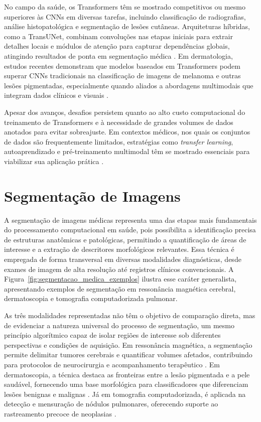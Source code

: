 No campo da saúde, os Transformers têm se mostrado competitivos ou mesmo superiores às CNNs em diversas tarefas, incluindo classificação de radiografias, análise histopatológica e segmentação de lesões cutâneas. Arquiteturas híbridas, como a TransUNet, combinam convoluções nas etapas iniciais para extrair detalhes locais e módulos de atenção para capturar dependências globais, atingindo resultados de ponta em segmentação médica \cite{chen2021transunet}. Em dermatologia, estudos recentes demonstram que modelos baseados em Transformers podem superar CNNs tradicionais na classificação de imagens de melanoma e outras lesões pigmentadas, especialmente quando aliados a abordagens multimodais que integram dados clínicos e visuais \cite{liu2021swin,raghu2021vision}.

Apesar dos avanços, desafios persistem quanto ao alto custo computacional do treinamento de Transformers e à necessidade de grandes volumes de dados anotados para evitar sobreajuste. Em contextos médicos, nos quais os conjuntos de dados são frequentemente limitados, estratégias como \textit{transfer learning}, autoaprendizado e pré-treinamento multimodal têm se mostrado essenciais para viabilizar sua aplicação prática \cite{khan2022transformers}.


\section{Segmentação de Imagens}
\label{sec:segmentacao}

A segmentação de imagens médicas representa uma das etapas mais fundamentais do processamento computacional em saúde, pois possibilita a identificação precisa de estruturas anatômicas e patológicas, permitindo a quantificação de áreas de interesse e a extração de descritores morfológicos relevantes. Essa técnica é empregada de forma transversal em diversas modalidades diagnósticas, desde exames de imagem de alta resolução até registros clínicos convencionais. A Figura~\ref{fig:segmentacao_medica_exemplos} ilustra esse caráter generalista, apresentando exemplos de segmentação em ressonância magnética cerebral, dermatoscopia e tomografia computadorizada pulmonar.

As três modalidades representadas não têm o objetivo de comparação direta, mas de evidenciar a natureza universal do processo de segmentação,  um mesmo princípio algorítmico capaz de isolar regiões de interesse sob diferentes perspectivas e condições de aquisição. Em ressonância magnética, a segmentação permite delimitar tumores cerebrais e quantificar volumes afetados, contribuindo para protocolos de neurocirurgia e acompanhamento terapêutico \cite{minaee2021image}. Em dermatoscopia, a técnica destaca as fronteiras entre a lesão pigmentada e a pele saudável, fornecendo uma base morfológica para classificadores que diferenciam lesões benignas e malignas \cite{tschandl2018ham10000}. Já em tomografia computadorizada, é aplicada na detecção e mensuração de nódulos pulmonares, oferecendo suporte ao rastreamento precoce de neoplasias \cite{shen2017deep}.

